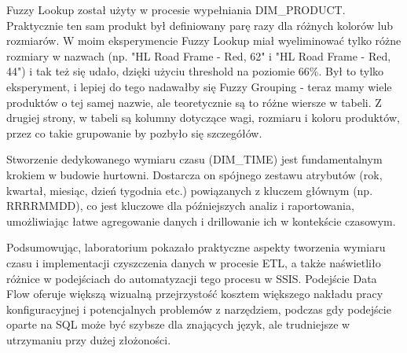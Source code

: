 \documentclass[a4paper,12pt]{article}
\begin{document}
Fuzzy Lookup został użyty w procesie wypełniania DIM\_PRODUCT. Praktycznie ten sam produkt był definiowany parę razy dla różnych kolorów lub rozmiarów. W moim eksperymencie Fuzzy Lookup miał wyeliminować tylko różne rozmiary w nazwach (np. "HL Road Frame - Red, 62" i "HL Road Frame - Red, 44") i tak też się udało, dzięki użyciu threshold na poziomie 66\%. Był to tylko eksperyment, i lepiej do tego nadawałby się Fuzzy Grouping - teraz mamy wiele produktów o tej samej nazwie, ale teoretycznie są to różne wiersze w tabeli. Z drugiej strony, w tabeli są kolumny dotyczące wagi, rozmiaru i koloru produktów, przez co takie grupowanie by pozbyło się szczegółów.

Stworzenie dedykowanego wymiaru czasu (DIM\_TIME) jest fundamentalnym krokiem w budowie hurtowni. Dostarcza on spójnego zestawu atrybutów (rok, kwartał, miesiąc, dzień tygodnia etc.) powiązanych z kluczem głównym (np. RRRRMMDD), co jest kluczowe dla późniejszych analiz i raportowania, umożliwiając łatwe agregowanie danych i drillowanie ich w kontekście czasowym.

Podsumowując, laboratorium pokazało praktyczne aspekty tworzenia wymiaru czasu i implementacji czyszczenia danych w procesie ETL, a także naświetliło różnice w podejściach do automatyzacji tego procesu w SSIS. Podejście Data Flow oferuje większą wizualną przejrzystość kosztem większego nakładu pracy konfiguracyjnej i potencjalnych problemów z narzędziem, podczas gdy podejście oparte na SQL może być szybsze dla znających język, ale trudniejsze w utrzymaniu przy dużej złożoności.

\printbibliography
\end{document}

